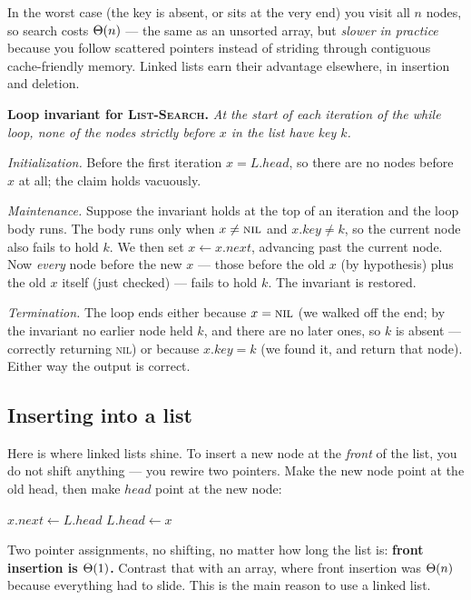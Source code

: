 In the worst case (the key is absent, or sits at the very end) you visit all $n$ nodes, so search costs $\Theta(n)$ --- the same as an unsorted array, but \emph{slower in practice} because you follow scattered pointers instead of striding through contiguous cache-friendly memory. Linked lists earn their advantage elsewhere, in insertion and deletion.

\begin{formalbox}
\textbf{Loop invariant for \textsc{List-Search}.} \emph{At the start of each iteration of the while loop, none of the nodes strictly before $x$ in the list have key $k$.}

\emph{Initialization.} Before the first iteration $x = L.head$, so there are no nodes before $x$ at all; the claim holds vacuously.

\emph{Maintenance.} Suppose the invariant holds at the top of an iteration and the loop body runs. The body runs only when $x \neq \textsc{nil}$ and $x.key \neq k$, so the current node also fails to hold $k$. We then set $x \gets x.next$, advancing past the current node. Now \emph{every} node before the new $x$ --- those before the old $x$ (by hypothesis) plus the old $x$ itself (just checked) --- fails to hold $k$. The invariant is restored.

\emph{Termination.} The loop ends either because $x = \textsc{nil}$ (we walked off the end; by the invariant no earlier node held $k$, and there are no later ones, so $k$ is absent --- correctly returning \textsc{nil}) or because $x.key = k$ (we found it, and return that node). Either way the output is correct.
\end{formalbox}

\subsection{Inserting into a list}

Here is where linked lists shine. To insert a new node at the \emph{front} of the list, you do not shift anything --- you rewire two pointers. Make the new node point at the old head, then make $head$ point at the new node:

\begin{algorithm}[H]
\caption{\textsc{List-Prepend}$(L, x)$ --- insert node $x$ at the front}
\DontPrintSemicolon
{}
$x.next \gets L.head$\;
$L.head \gets x$\;
\end{algorithm}

Two pointer assignments, no shifting, no matter how long the list is: \textbf{front insertion is $\Theta(1)$.} Contrast that with an array, where front insertion was $\Theta(n)$ because everything had to slide. This is the main reason to use a linked list.


